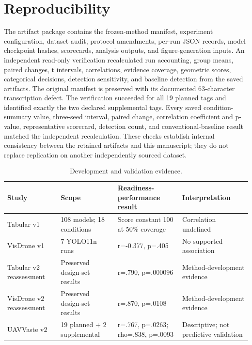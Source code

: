 \documentclass[conference]{IEEEtran}
\begin{document}
\section{Reproducibility}
The artifact package contains the frozen-method manifest, experiment configuration, dataset audit, protocol amendments, per-run JSON records, model checkpoint hashes, scorecards, analysis outputs, and figure-generation inputs. An independent read-only verification recalculated run accounting, group means, paired changes, t intervals, correlations, evidence coverage, geometric scores, categorical decisions, detection sensitivity, and baseline detection from the saved artifacts. The original manifest is preserved with its documented 63-character transcription defect.
The verification succeeded for all 19 planned tags and identified exactly the two declared supplemental tags. Every saved condition-summary value, three-seed interval, paired change, correlation coefficient and p-value, representative scorecard, detection count, and conventional-baseline result matched the independent recalculation. These checks establish internal consistency between the retained artifacts and this manuscript; they do not replace replication on another independently sourced dataset.
\begin{table}[t]
\caption{Development and validation evidence.}
\centering\scriptsize
\begin{tabular}{p{}p{}p{}p{}}
\toprule Study & Scope & Readiness-performance result & Interpretation \\\midrule
Tabular v1 & 108 models; 18 conditions & Score constant 100 at 50\% coverage & Correlation undefined \\
VisDrone v1 & 7 YOLO11n runs & r=-0.377, p=.405 & No supported association \\
Tabular v2 reassessment & Preserved design-set results & r=.790, p=.000096 & Method-development evidence \\
VisDrone v2 reassessment & Preserved design-set results & r=.870, p=.0108 & Method-development evidence \\
UAVVaste v2 & 19 planned + 2 supplemental & r=.767, p=.0263; rho=.838, p=.0093 & Descriptive; not predictive validation \\
\bottomrule\end{tabular}
\end{table}
\end{document}
